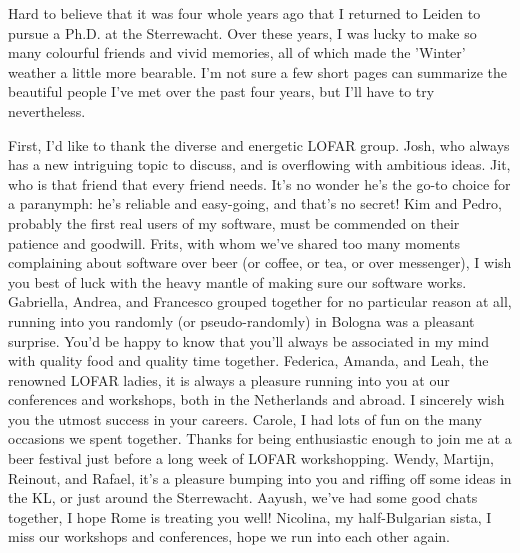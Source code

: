 \cleardoublepage
{}
{}
\begin{thesisacknowledgements}
\begin{changemargin}{-0.3cm}{-0.3cm}


    \newcommand{\bees}[1]{\texttt{[image: coloremoji.sty/emoji\_images/hires/\#1.pdf]}}
\singlespacing
{\fontsize{11}{12}\selectfont
Hard to believe that it was four whole years ago that I returned to Leiden to pursue a Ph.D. at the Sterrewacht. Over these years, I was lucky to make so many colourful friends and vivid memories, all of which made the 'Winter' weather a little more bearable. I'm not sure a few short pages can summarize the beautiful people I've met over the past four years, but I'll have to try nevertheless.

    First, I'd like to thank the diverse and energetic LOFAR group. Josh, who always has a new intriguing topic to discuss, and is overflowing with ambitious ideas. Jit, who is that friend that every friend needs. It's no wonder he's the go-to choice for a paranymph: he's reliable and easy-going, and that's no secret! Kim and Pedro, probably the first real users of my software, must be commended on their patience and goodwill. Frits, with whom we've shared too many moments complaining about software over beer (or coffee, or tea, or over messenger), I wish you best of luck with the heavy mantle of making sure our software works. Gabriella, Andrea, and Francesco grouped together for no particular reason at all, running into you randomly (or pseudo-randomly) in Bologna was a pleasant surprise. You'd be happy to know that you'll always be associated in my mind with quality food and quality time together. Federica, Amanda, and Leah, the renowned LOFAR ladies, it is always a pleasure running into you at our conferences and workshops, both in the Netherlands and abroad. I sincerely wish you the utmost success in your careers. Carole, I had lots of fun on the many occasions we spent together. Thanks for being enthusiastic enough to join me at a beer festival just before a long week of LOFAR workshopping. Wendy, Martijn, Reinout, and Rafael, it's a pleasure bumping into you and riffing off some ideas in the KL, or just around the Sterrewacht. Aayush, we've had some good chats together, I hope Rome is treating you well! Nicolina, my half-Bulgarian sista, I miss our workshops and conferences, hope we run into each other again. 

}
\end{changemargin}
\end{thesisacknowledgements}
